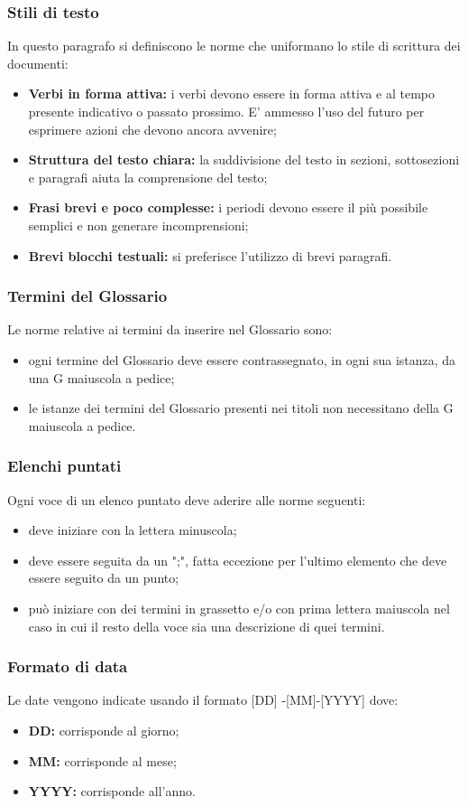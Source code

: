 \subsubsection{Stili di testo}
In questo paragrafo si definiscono le norme che uniformano lo stile di scrittura dei documenti:
\begin{itemize}
\item \textbf{Verbi in forma attiva:} i verbi devono essere in forma attiva e al tempo presente indicativo o passato prossimo. E' ammesso l'uso del futuro per esprimere azioni che devono ancora avvenire;
	\item \textbf{Struttura del testo chiara:} la suddivisione del testo in sezioni, sottosezioni e paragrafi aiuta la comprensione del testo;
		\item \textbf{Frasi brevi e poco complesse:} i periodi devono essere il più possibile semplici e non generare incomprensioni;
			\item \textbf{Brevi blocchi testuali:} si preferisce l'utilizzo di brevi paragrafi.
\end{itemize}
\subsubsection{Termini del Glossario}
Le norme relative ai termini da inserire nel Glossario sono: 
\begin{itemize}
\item ogni termine del Glossario deve essere contrassegnato, in ogni sua istanza, da una G maiuscola a pedice; 
	\item le istanze dei termini del Glossario presenti nei titoli non necessitano della G maiuscola a pedice. 
\end{itemize}
\subsubsection{Elenchi puntati}
Ogni voce di un elenco puntato deve aderire alle norme seguenti: 
\begin{itemize}
	\item deve iniziare con la lettera minuscola;
	\item deve essere seguita da un ";", fatta eccezione per l’ultimo elemento che deve essere seguito da un punto; 
	\item può iniziare con dei termini in grassetto e/o con prima lettera maiuscola nel caso in cui il resto della voce sia una descrizione di quei termini.
\end{itemize}
\subsubsection{Formato di data}
Le date vengono indicate usando il formato
[DD] -[MM]-[YYYY] dove:
\\
\begin{itemize}
\item \textbf{DD:} corrisponde al giorno;
	\item \textbf{MM:} corrisponde al mese;
		\item \textbf{YYYY:} corrisponde all'anno.
\end{itemize}
